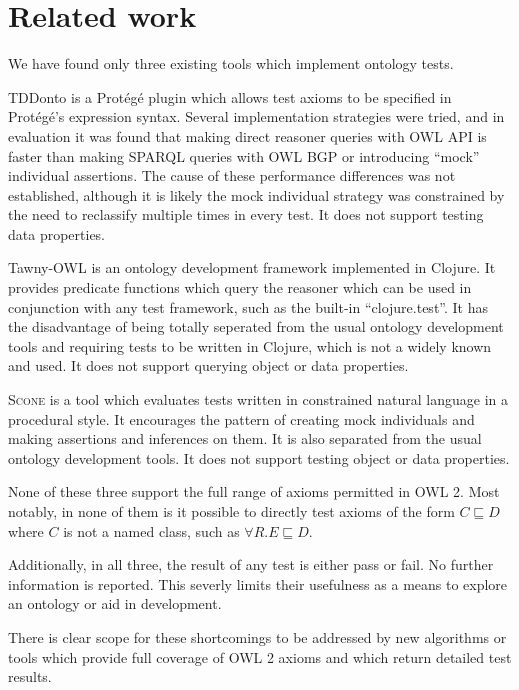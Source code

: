 \documentclass[paper.tex]{subfiles}
\begin{document}
\section{Related work}
\label{sec:related}

We have found only three existing tools which implement ontology tests.

TDDonto \cite{Lawrynowicz:TDDontoTool} is a Prot\'eg\'e plugin which allows test axioms to be specified in Prot\'eg\'e's expression syntax.
Several implementation strategies were tried, and in evaluation it was found that making direct reasoner queries with OWL API is faster than making SPARQL queries with OWL BGP or introducing ``mock'' individual assertions.
The cause of these performance differences was not established, although it is likely the mock individual strategy was constrained by the need to reclassify multiple times in every test.  It does not support testing data properties.

Tawny-OWL \cite{Warrender:HowWhatWhyTest} is an ontology development framework implemented in Clojure.
It provides predicate functions which query the reasoner which can be used in conjunction with any test framework, such as the built-in ``clojure.test''.
It has the disadvantage of being totally seperated from the usual ontology development tools and requiring tests to be written in Clojure, which is not a widely known and used.
It does not support querying object or data properties.

\textsc{Scone} \cite{Scone:Bitbucket} is a tool which evaluates tests written in constrained natural language in a procedural style.
It encourages the pattern of creating mock individuals and making assertions and inferences on them.
It is also separated from the usual ontology development tools.  It does not support testing object or data properties.

None of these three support the full range of axioms permitted in OWL 2.
Most notably, in none of them is it possible to directly test axioms of the form $C \sqsubseteq D$ where $C$ is not a named class, such as $\forall R.E \sqsubseteq D$.

Additionally, in all three, the result of any test is either pass or fail.
No further information is reported.
This severly limits their usefulness as a means to explore an ontology or aid in development.

There is clear scope for these shortcomings to be addressed by new algorithms or tools which provide full coverage of OWL 2 axioms and which return detailed test results.
\end{document}
